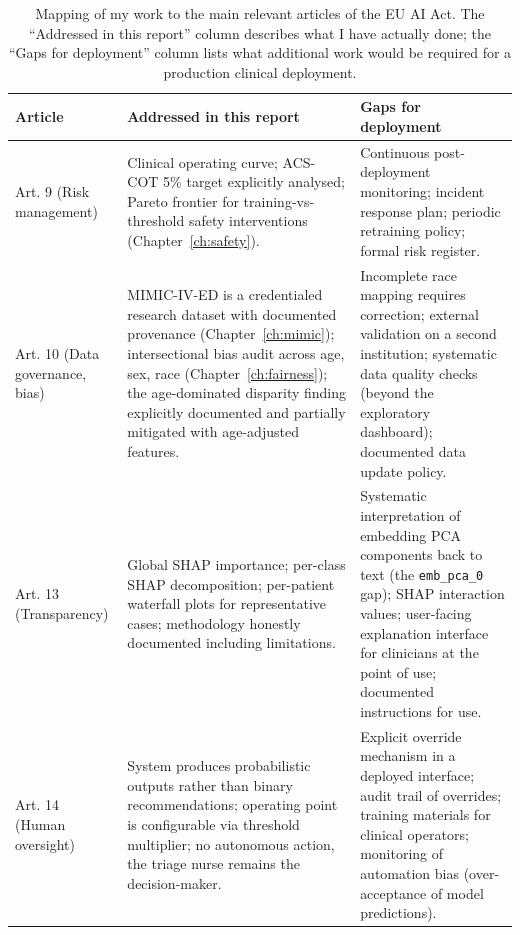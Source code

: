 \begin{table}[htbp]
 \centering
 \caption[EU AI Act compliance mapping]{Mapping of my work to the main relevant articles of the EU AI Act. The ``Addressed in this report'' column describes what I have actually done; the ``Gaps for deployment'' column lists what additional work would be required for a production clinical deployment.}
 \label{tab:compliance}
 \small
 \begin{tabularx}{\textwidth}{p{2.7cm} X X}
 \toprule
 \textbf{Article} & \textbf{Addressed in this report} & \textbf{Gaps for deployment} \\
 \midrule
 Art. 9 (Risk management) & 
 Clinical operating curve; ACS-COT 5\% target explicitly analysed; Pareto frontier for training-vs-threshold safety interventions (Chapter~\ref{ch:safety}). &
 Continuous post-deployment monitoring; incident response plan; periodic retraining policy; formal risk register. \\
 \addlinespace
 Art. 10 (Data governance, bias) & 
 MIMIC-IV-ED is a credentialed research dataset with documented provenance (Chapter~\ref{ch:mimic}); intersectional bias audit across age, sex, race (Chapter~\ref{ch:fairness}); the age-dominated disparity finding explicitly documented and partially mitigated with age-adjusted features. &
 Incomplete race mapping requires correction; external validation on a second institution; systematic data quality checks (beyond the exploratory dashboard); documented data update policy. \\
 \addlinespace
 Art. 13 (Transparency) & 
 Global SHAP importance; per-class SHAP decomposition; per-patient waterfall plots for representative cases; methodology honestly documented including limitations. &
 Systematic interpretation of embedding PCA components back to text (the \texttt{emb\_pca\_0} gap); SHAP interaction values; user-facing explanation interface for clinicians at the point of use; documented instructions for use. \\
 \addlinespace
 Art. 14 (Human oversight) & 
 System produces probabilistic outputs rather than binary recommendations; operating point is configurable via threshold multiplier; no autonomous action, the triage nurse remains the decision-maker. &
 Explicit override mechanism in a deployed interface; audit trail of overrides; training materials for clinical operators; monitoring of automation bias (over-acceptance of model predictions). \\
 \bottomrule
 \end{tabularx}
\end{table}

